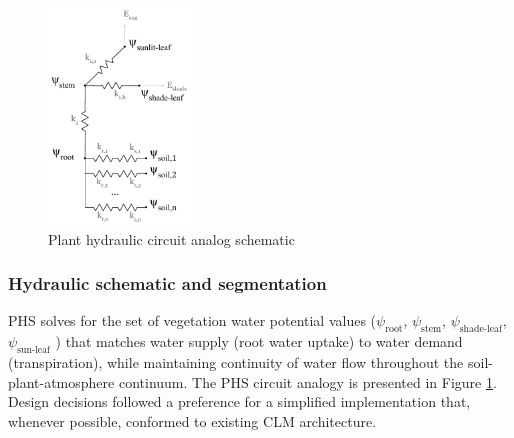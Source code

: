 \documentclass[draft,linenumbers]{agujournal}
\begin{document}
  \begin{figure}[h]
     \centering
     \includegraphics[width=9pc]{../figs/circuit.pdf}
     \caption{Plant hydraulic circuit analog schematic}
     \label{circuit}
  \end{figure}

  \subsubsection{Hydraulic schematic and segmentation}
  PHS solves for the set of vegetation water potential values 
  ($\psi_{\text{root}}$, $\psi_{\text{stem}}$, $\psi_{\text{shade-leaf}}$, $\psi_{\text{sun-leaf}}$ ) 
  that matches water supply (root water uptake) to water demand (transpiration), 
  while maintaining continuity of water flow throughout the soil-plant-atmosphere continuum.
  The PHS circuit analogy is presented in Figure \ref{circuit}.
    Design decisions followed a preference for a simplified implementation that,
  whenever possible, conformed to existing CLM architecture.
  
\end{document}
